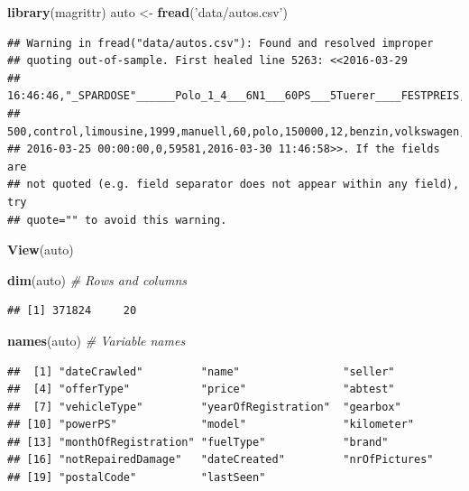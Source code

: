 \documentclass[]{book}
\newenvironment{Shaded}{\begin{snugshade}}{\end{snugshade}}
\newcommand{\CommentTok}[1]{\textcolor[rgb]{0.56,0.35,0.01}{\textit{#1}}}
\newcommand{\KeywordTok}[1]{\textcolor[rgb]{0.13,0.29,0.53}{\textbf{#1}}}
\newcommand{\NormalTok}[1]{#1}
\newcommand{\StringTok}[1]{\textcolor[rgb]{0.31,0.60,0.02}{#1}}
\theoremstyle{definition}
\theoremstyle{definition}
\theoremstyle{definition}
\theoremstyle{remark}
\begin{document}
\begin{Shaded}
\begin{Highlighting}[]
\KeywordTok{library}\NormalTok{(magrittr)}
\NormalTok{auto <-}\StringTok{ }\KeywordTok{fread}\NormalTok{(}\StringTok{'data/autos.csv'}\NormalTok{)}
\end{Highlighting}
\end{Shaded}

\begin{verbatim}
## Warning in fread("data/autos.csv"): Found and resolved improper
## quoting out-of-sample. First healed line 5263: <<2016-03-29
## 16:46:46,"_SPARDOSE"______Polo_1_4___6N1___60PS___5Tuerer____FESTPREIS,privat,Angebot,
## 500,control,limousine,1999,manuell,60,polo,150000,12,benzin,volkswagen,ja,
## 2016-03-25 00:00:00,0,59581,2016-03-30 11:46:58>>. If the fields are
## not quoted (e.g. field separator does not appear within any field), try
## quote="" to avoid this warning.
\end{verbatim}

\begin{Shaded}
\begin{Highlighting}[]
\KeywordTok{View}\NormalTok{(auto)}
\end{Highlighting}
\end{Shaded}

\begin{Shaded}
\begin{Highlighting}[]
\KeywordTok{dim}\NormalTok{(auto) }\CommentTok{#  Rows and columns}
\end{Highlighting}
\end{Shaded}

\begin{verbatim}
## [1] 371824     20
\end{verbatim}

\begin{Shaded}
\begin{Highlighting}[]
\KeywordTok{names}\NormalTok{(auto) }\CommentTok{# Variable names}
\end{Highlighting}
\end{Shaded}

\begin{verbatim}
##  [1] "dateCrawled"         "name"                "seller"             
##  [4] "offerType"           "price"               "abtest"             
##  [7] "vehicleType"         "yearOfRegistration"  "gearbox"            
## [10] "powerPS"             "model"               "kilometer"          
## [13] "monthOfRegistration" "fuelType"            "brand"              
## [16] "notRepairedDamage"   "dateCreated"         "nrOfPictures"       
## [19] "postalCode"          "lastSeen"
\end{verbatim}
\end{document}
